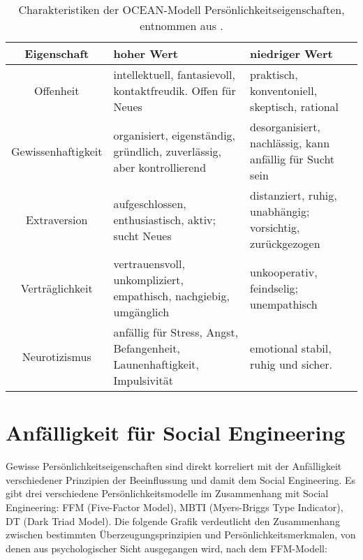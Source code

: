 \begin{table}[!htp]
    \centering
    \begin{tabular}{ |c|m{11em}|m{11em}| }
        \hline
        \textbf{Eigenschaft} & \textbf{hoher Wert}                                                      & \textbf{niedriger Wert}                                   \\
        \hline \hline
        Offenheit            & intellektuell, fantasievoll, kontaktfreudik. Offen für Neues             & praktisch, konventoniell, skeptisch, rational             \\
        \hline
        Gewissenhaftigkeit   & organisiert, eigenständig, gründlich, zuverlässig, aber kontrollierend   & desorganisiert, nachlässig, kann anfällig für Sucht sein  \\
        \hline
        Extraversion         & aufgeschlossen, enthusiastisch, aktiv; sucht Neues                       & distanziert, ruhig, unabhängig; vorsichtig, zurückgezogen \\
        \hline
        Verträglichkeit      & vertrauensvoll, unkompliziert, empathisch, nachgiebig, umgänglich        & unkooperativ, feindselig; unempathisch                    \\
        \hline
        Neurotizismus        & anfällig für Stress, Angst, Befangenheit, Launenhaftigkeit, Impulsivität & emotional stabil, ruhig und sicher.                       \\
        \hline
    \end{tabular}
    \caption{Charakteristiken der OCEAN-Modell Persönlichkeitseigenschaften, entnommen aus .}
\end{table}
\FloatBarrier

\section{Anfälligkeit für Social Engineering}

Gewisse Persönlichkeitseigenschaften sind direkt korreliert mit der Anfälligkeit verschiedener Prinzipien der Beeinflussung und damit dem Social Engineering.
Es gibt drei verschiedene Persönlichkeitsmodelle im Zusammenhang mit Social Engineering: FFM (Five-Factor Model), MBTI (Myers-Briggs Type Indicator), DT (Dark Triad Model).
Die folgende Grafik verdeutlicht den Zusammenhang zwischen bestimmten Überzeugungsprinzipien und Persönlichkeitsmerkmalen, von denen aus psychologischer Sicht ausgegangen wird, nach dem FFM-Modell:

